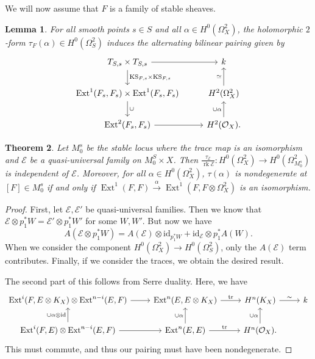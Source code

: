 \documentclass[leqno, openany]{memoir}
\newtheorem{thm}{Theorem}[section]
\newtheorem{lem}[thm]{Lemma}
\theoremstyle{definition}
\theoremstyle{remark}
\theoremstyle{plain}
\theoremstyle{definition}
\theoremstyle{remark}
\newcommand{\mc}[1]{\mathcal{#1}}
\newcommand{\mr}[1]{\mathrm{#1}}
\newcommand{\on}[1]{\operatorname{#1}}
\DeclareMathOperator{\Ext}{Ext}
\begin{document}
We will now assume that $F$ is a family of stable sheaves.
\begin{lem}
    For all smooth points $s \in S$ and all $\alpha \in H^0(\Omega^2_X)$, the holomorphic $2$-form $\tau_F(\alpha) \in H^0(\Omega^2_S)$ induces the alternating bilinear pairing given by
    \begin{equation*}
    \begin{tikzcd}
        T_{S,s} \times T_{S,s} \ar{r} \ar{d}{\mr{KS}_{F,s} \times \mr{KS}_{F,s}} & k \\
        \Ext^1(F_s, F_s) \times \Ext^1(F_s, F_s) \ar{d}{\cup} & H^2(\Omega^2_X) \ar{u}{\simeq} \\
        \Ext^2(F_s, F_s) \ar{r} & H^2(\mc{O}_X). \ar{u}{\cup \alpha}
    \end{tikzcd}
    \end{equation*}
\end{lem}

\begin{thm}
    Let $M_0^s$ be the stable locus where the trace map is an isomorphism and $\mc{E}$ be a quasi-universal family on $M_0^S \times X$. Then $\frac{\tau_{\mc{E}}}{\on{rk} \mc{E}} \colon H^0(\Omega^2_X) \to H^0(\Omega^2_{M_0^s})$ is independent of $\mc{E}$. Moreover, for all $\alpha \in H^0(\Omega_X^2)$, $\tau(\alpha)$ is nondegenerate at $[F] \in M_0^s$ if and only if $\Ext^1(F, F) \xrightarrow{\alpha} \Ext^1(F, F \otimes \Omega^2_X)$ is an isomorphism.
\end{thm}

\begin{proof}
    First, let $\mc{E}, \mc{E}'$ be quasi-universal families. Then we know that $\mc{E} \otimes p_1^* W = \mc{E}' \otimes p_1^* W'$ for some $W, W'$. But now we have
    \[ A(\mc{E} \otimes p_1^* W) = A(\mc{E}) \otimes \mr{id}_{p_1^* W} + \mr{id}_{\mc{E}} \otimes p_1^* A(W). \]
    When we consider the component $H^0(\Omega_X^2) \to H^0(\Omega_S^2)$, only the $A(\mc{E})$ term contributes. Finally, if we consider the traces, we obtain the desired result.

    The second part of this follows from Serre duality. Here, we have
    \begin{equation*}
    \begin{tikzcd}
        \Ext^i(F, E \otimes K_X) \otimes \Ext^{n-i}(E, F) \ar{r} & \Ext^n(E, E \otimes K_X) \ar{r}{\tr} & H^n(K_X) \ar{r}{\sim} & k \\
        \Ext^i(F, E) \otimes \Ext^{n-i}(E, F) \ar{r} \ar{u}{\cup \alpha \otimes \mr{id}} & \Ext^n(E, E) \ar{u}{\cup \alpha} \ar{r}{\tr} & H^n(\mc{O}_X) \ar{u}{\cup \alpha}.
    \end{tikzcd}
    \end{equation*}
    This must commute, and thus our pairing must have been nondegenerate.
\end{proof}
\end{document}
